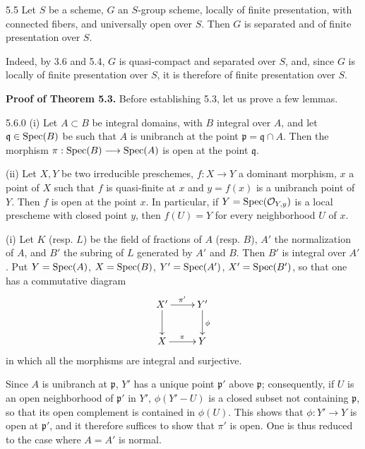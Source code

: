 \begin{corollary}{5.5}\label{VIB.5.5}
Let $S$ be a scheme, $G$ an $S$-group scheme, locally of finite presentation, with connected fibers, and universally open over $S$. Then $G$ is separated and of finite presentation over $S$.
\end{corollary}
Indeed, by 3.6 and 5.4, $G$ is quasi-compact and separated over $S$, and, since $G$ is locally of finite presentation over $S$, it is therefore of finite presentation over $S$.

\textbf{Proof of Theorem 5.3.} Before establishing 5.3, let us prove a few lemmas.
\begin{lemma}{5.6.0}\label{VIB.5.6.0}
(i) Let $A\subset B$ be integral domains, with $B$ integral over $A$, and let $\mathfrak q\in\operatorname{Spec}(B)$ be such that $A$ is unibranch at the point $\mathfrak p=\mathfrak q\cap A$. Then the morphism $\pi:\operatorname{Spec}(B)\longrightarrow\operatorname{Spec}(A)$ is open at the point $\mathfrak q$.

(ii) Let $X,Y$ be two irreducible preschemes, $f:X\to Y$ a dominant morphism, $x$ a point of $X$ such that $f$ is quasi-finite at $x$ and $y=f(x)$ is a unibranch point of $Y$. Then $f$ is open at the point $x$. In particular, if $Y=\operatorname{Spec}(\mathcal{O}_{Y,y})$ is a local prescheme with closed point $y$, then $f(U)=Y$ for every neighborhood $U$ of $x$.
\end{lemma}
(i) Let $K$ (resp. $L$) be the field of fractions of $A$ (resp. $B$), $A'$ the normalization of $A$, and $B'$ the subring of $L$ generated by $A'$ and $B$. Then $B'$ is integral over $A'$. Put $Y=\operatorname{Spec}(A)$, $X=\operatorname{Spec}(B)$, $Y'=\operatorname{Spec}(A')$, $X'=\operatorname{Spec}(B')$, so that one has a commutative diagram
\[
\xymatrix{X'\ar[r]^{\pi'}\ar[d]&Y'\ar[d]^\phi\\X\ar[r]^\pi&Y}
\]
in which all the morphisms are integral and surjective.

Since $A$ is unibranch at $\mathfrak p$, $Y'$ has a unique point $\mathfrak p'$ above $\mathfrak p$; consequently, if $U$ is an open neighborhood of $\mathfrak p'$ in $Y'$, $\phi(Y'-U)$ is a closed subset not containing $\mathfrak p$, so that its open complement is contained in $\phi(U)$. This shows that $\phi:Y'\to Y$ is open at $\mathfrak p'$, and it therefore suffices to show that $\pi'$ is open. One is thus reduced to the case where $A=A'$ is normal.

